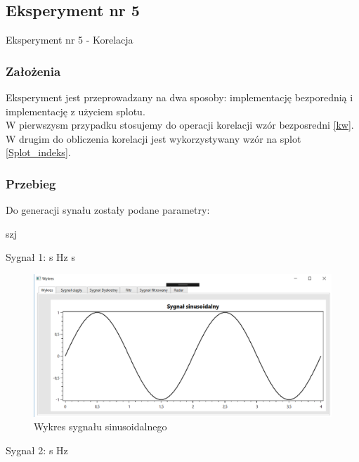 \documentclass[12pt]{article}
\begin{document}

\subsection{Eksperyment nr 5}

Eksperyment nr 5 - Korelacja\\

\subsubsection{Założenia}
Eksperyment jest przeprowadzany na dwa sposoby: implementację bezporednią i implementację z użyciem splotu.
\\W pierwszysm przypadku stosujemy do operacji korelacji wzór bezposredni   \ref{kw}. W drugim do obliczenia korelacji jest wykorzystywany wzór na splot \ref{Splot_indeks}.

\subsubsection{Przebieg}
Do generacji synału zostały podane parametry:

\begin{labeling}{szj}
\item [Sygnał 1:]
 s
 Hz
 s

\begin{figure}[h!]
 \centering
 \includegraphics[width=12.3cm]{sin.PNG}
 \vspace{-0.3cm}
 \caption{Wykres sygnału sinusoidalnego}
 \label{sin}
\end{figure}

\item [Sygnał 2:]
 s
 Hz

\end{labeling}
\end{document}
